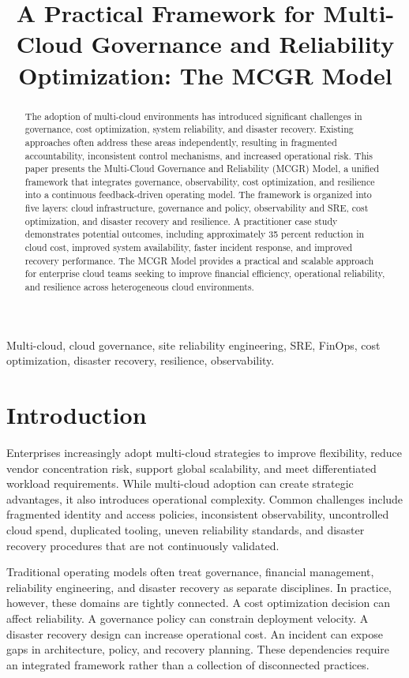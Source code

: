 \documentclass[conference]{IEEEtran}
\title{A Practical Framework for Multi-Cloud Governance and Reliability Optimization: The MCGR Model}
\author{\IEEEauthorblockN{Ramesh Marella}
\IEEEauthorblockA{Cloud Architecture and Site Reliability Engineering Specialist\\
Independent Researcher\\
Email: rameshmarella@gmail.com}}
\begin{document}
\maketitle

\begin{abstract}
The adoption of multi-cloud environments has introduced significant challenges in governance, cost optimization, system reliability, and disaster recovery. Existing approaches often address these areas independently, resulting in fragmented accountability, inconsistent control mechanisms, and increased operational risk. This paper presents the Multi-Cloud Governance and Reliability (MCGR) Model, a unified framework that integrates governance, observability, cost optimization, and resilience into a continuous feedback-driven operating model. The framework is organized into five layers: cloud infrastructure, governance and policy, observability and SRE, cost optimization, and disaster recovery and resilience. A practitioner case study demonstrates potential outcomes, including approximately 35 percent reduction in cloud cost, improved system availability, faster incident response, and improved recovery performance. The MCGR Model provides a practical and scalable approach for enterprise cloud teams seeking to improve financial efficiency, operational reliability, and resilience across heterogeneous cloud environments.
\end{abstract}

\begin{IEEEkeywords}
Multi-cloud, cloud governance, site reliability engineering, SRE, FinOps, cost optimization, disaster recovery, resilience, observability.
\end{IEEEkeywords}

\section{Introduction}
Enterprises increasingly adopt multi-cloud strategies to improve flexibility, reduce vendor concentration risk, support global scalability, and meet differentiated workload requirements. While multi-cloud adoption can create strategic advantages, it also introduces operational complexity. Common challenges include fragmented identity and access policies, inconsistent observability, uncontrolled cloud spend, duplicated tooling, uneven reliability standards, and disaster recovery procedures that are not continuously validated.

Traditional operating models often treat governance, financial management, reliability engineering, and disaster recovery as separate disciplines. In practice, however, these domains are tightly connected. A cost optimization decision can affect reliability. A governance policy can constrain deployment velocity. A disaster recovery design can increase operational cost. An incident can expose gaps in architecture, policy, and recovery planning. These dependencies require an integrated framework rather than a collection of disconnected practices.
\end{document}
